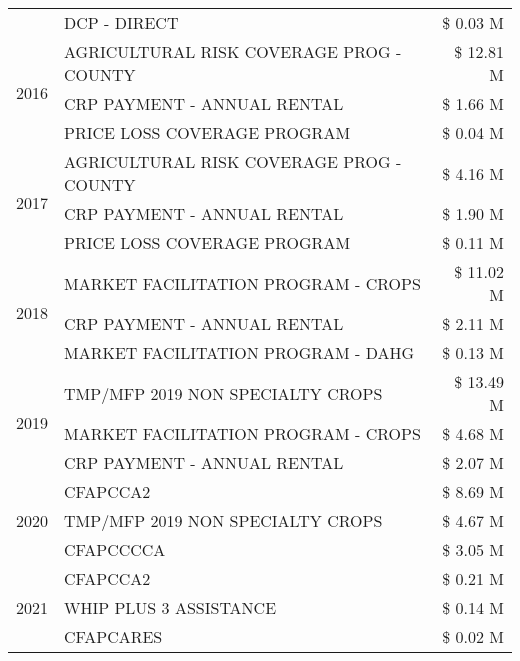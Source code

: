 \begin{tabular}{llr}
 & DCP - DIRECT & \$ 0.03 M \\
\cline{1-3}
\multirow[t]{3}{*}{2016} & AGRICULTURAL RISK COVERAGE PROG - COUNTY      & \$ 12.81 M \\
 & CRP PAYMENT - ANNUAL RENTAL                   & \$ 1.66 M \\
 & PRICE LOSS COVERAGE PROGRAM                   & \$ 0.04 M \\
\cline{1-3}
\multirow[t]{3}{*}{2017} & AGRICULTURAL RISK COVERAGE PROG - COUNTY & \$ 4.16 M \\
 & CRP PAYMENT - ANNUAL RENTAL & \$ 1.90 M \\
 & PRICE LOSS COVERAGE PROGRAM & \$ 0.11 M \\
\cline{1-3}
\multirow[t]{3}{*}{2018} & MARKET FACILITATION PROGRAM - CROPS & \$ 11.02 M \\
 & CRP PAYMENT - ANNUAL RENTAL & \$ 2.11 M \\
 & MARKET FACILITATION PROGRAM - DAHG & \$ 0.13 M \\
\cline{1-3}
\multirow[t]{3}{*}{2019} & TMP/MFP 2019 NON SPECIALTY CROPS & \$ 13.49 M \\
 & MARKET FACILITATION PROGRAM - CROPS & \$ 4.68 M \\
 & CRP PAYMENT - ANNUAL RENTAL & \$ 2.07 M \\
\cline{1-3}
\multirow[t]{3}{*}{2020} & CFAPCCA2 & \$ 8.69 M \\
 & TMP/MFP 2019 NON SPECIALTY CROPS & \$ 4.67 M \\
 & CFAPCCCCA & \$ 3.05 M \\
\cline{1-3}
\multirow[t]{3}{*}{2021} & CFAPCCA2 & \$ 0.21 M \\
 & WHIP PLUS 3 ASSISTANCE & \$ 0.14 M \\
 & CFAPCARES & \$ 0.02 M \\
\cline{1-3}
\bottomrule
\end{tabular}
